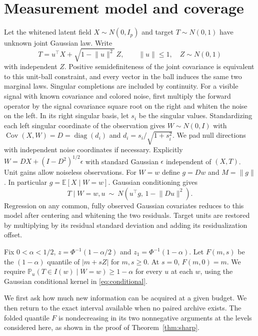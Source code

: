 \documentclass[11pt]{article}
\newcommand{\E}{\mathbb E}
\newcommand{\Prob}{\mathbb P}
\newcommand{\norm}[1]{\lVert #1\rVert}
\newcommand{\diag}{\operatorname{diag}}
\begin{document}
\section{Measurement model and coverage}
Let the whitened latent field $X\sim N(0,I_p)$ and target $T\sim N(0,1)$ have unknown joint Gaussian law. Write
\begin{equation}
 T=u^\top X+\sqrt{1-\norm{u}^2}\,Z,\qquad \norm{u}\le1,\quad Z\sim N(0,1)
 \label{eq:model}
\end{equation}
with independent $Z$. Positive semidefiniteness of the joint covariance is equivalent to this unit-ball constraint, and every vector in the ball induces the same two marginal laws. Singular completions are included by continuity. For a visible signal with known covariance and colored noise, first multiply the forward operator by the signal covariance square root on the right and whiten the noise on the left. In its right singular basis, let $s_i$ be the singular values. Standardizing each left singular coordinate of the observation gives $W\sim N(0,I)$ with $\operatorname{Cov}(X,W)=D=\diag(d_i)$ and $d_i=s_i/\sqrt{1+s_i^2}$. We pad null directions with independent noise coordinates if necessary. Explicitly $W=DX+(I-D^2)^{1/2}\epsilon$ with standard Gaussian $\epsilon$ independent of $(X,T)$. Unit gains allow noiseless observations. For $W=w$ define $g=Dw$ and $M=\norm{g}$. In particular $g=\E[X\mid W=w]$. Gaussian conditioning gives
\begin{equation}
 T\mid W=w,u\ \sim\ N(u^\top g,\,1-\norm{Du}^2).
 \label{eq:conditional}
\end{equation}
Regression on any common, fully observed Gaussian covariates reduces to this model after centering and whitening the two residuals. Target units are restored by multiplying by its residual standard deviation and adding its residualization offset.

Fix $0<\alpha<1/2$, $z=\Phi^{-1}(1-\alpha/2)$ and $z_1=\Phi^{-1}(1-\alpha)$. Let $F(m,s)$ be the $(1-\alpha)$ quantile of $|m+sZ|$ for $m,s\ge0$. At $s=0$, $F(m,0)=m$. We require $\Prob_u(T\in I(w)\mid W=w)\ge1-\alpha$ for every $u$ at each $w$, using the Gaussian conditional kernel in \eqref{eq:conditional}.

We first ask how much new information can be acquired at a given budget. We then return to the exact interval available when no paired archive exists. The folded quantile $F$ is nondecreasing in its two nonnegative arguments at the levels considered here, as shown in the proof of Theorem~\ref{thm:sharp}.
\end{document}
